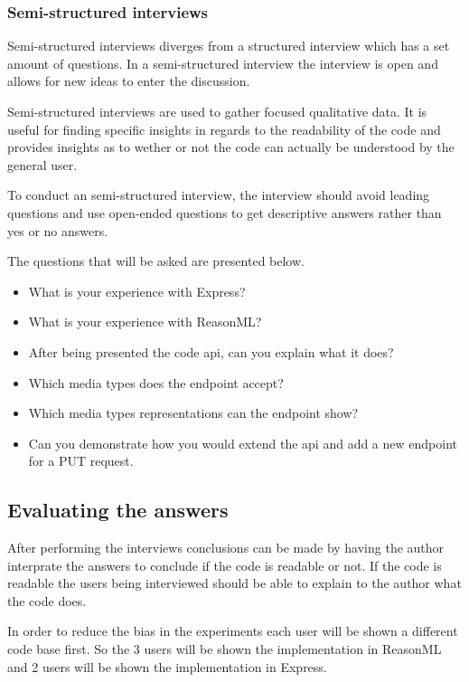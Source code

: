 \subsubsection{Semi-structured interviews}

Semi-structured interviews diverges from a structured interview which has a set
amount of questions. In a semi-structured interview the interview is open and
allows for new ideas to enter the discussion. 

Semi-structured interviews are used to gather focused qualitative data. It is
useful for finding specific insights in regards to the readability of the code
and provides insights as to wether or not the code can actually be understood by
the general user.

To conduct an semi-structured interview, the interview should avoid leading
questions and use open-ended questions to get descriptive answers rather than
yes or no answers. 

The questions that will be asked are presented below.

\begin{itemize}
    \item What is your experience with Express?
    \item What is your experience with ReasonML?
    \item After being presented the code api, can you explain what it does?
    \item Which media types does the endpoint accept?
    \item Which media types representations can the endpoint show?
    \item Can you demonstrate how you would extend the api and add a new endpoint
    for a PUT request.
\end{itemize}

\subsection{Evaluating the answers}

After performing the interviews conclusions can be made by having the author
interprate the answers to conclude if the code is readable or not. If the code
is readable the users being interviewed should be able to explain to the author
what the code does.

In order to reduce the bias in the experiments each user will be shown a
different code base first. So the 3 users will be shown the implementation in
ReasonML and 2 users will be shown the implementation in Express.

